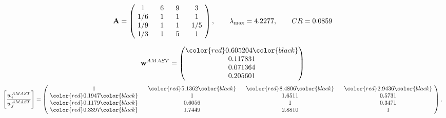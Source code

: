 \begin{example}
\begin{equation*}
\mathbf{A} =
\begin{pmatrix}
$\,\,$ 1 $\,\,$ & $\,\,$6$\,\,$ & $\,\,$9$\,\,$ & $\,\,$3 $\,\,$ \\
$\,\,$ 1/6$\,\,$ & $\,\,$ 1 $\,\,$ & $\,\,$1$\,\,$ & $\,\,$1 $\,\,$ \\
$\,\,$ 1/9$\,\,$ & $\,\,$ 1 $\,\,$ & $\,\,$ 1 $\,\,$ & $\,\,$ 1/5 $\,\,$ \\
$\,\,$ 1/3$\,\,$ & $\,\,$ 1 $\,\,$ & $\,\,$5$\,\,$ & $\,\,$ 1  $\,\,$ \\
\end{pmatrix},
\qquad
\lambda_{\max} =
4.2277,
\qquad
CR = 0.0859
\end{equation*}

\begin{equation*}
\mathbf{w}^{AMAST} =
\begin{pmatrix}
\color{red} 0.605204\color{black} \\
0.117831\\
0.071364\\
0.205601
\end{pmatrix}\end{equation*}
\begin{equation*}
\left[ \frac{{w}^{AMAST}_i}{{w}^{AMAST}_j} \right] =
\begin{pmatrix}
$\,\,$ 1 $\,\,$ & $\,\,$\color{red} 5.1362\color{black} $\,\,$ & $\,\,$\color{red} 8.4806\color{black} $\,\,$ & $\,\,$\color{red} 2.9436\color{black} $\,\,$ \\
$\,\,$\color{red} 0.1947\color{black} $\,\,$ & $\,\,$ 1 $\,\,$ & $\,\,$1.6511$\,\,$ & $\,\,$0.5731  $\,\,$ \\
$\,\,$\color{red} 0.1179\color{black} $\,\,$ & $\,\,$0.6056$\,\,$ & $\,\,$ 1 $\,\,$ & $\,\,$0.3471 $\,\,$ \\
$\,\,$\color{red} 0.3397\color{black} $\,\,$ & $\,\,$1.7449$\,\,$ & $\,\,$2.8810$\,\,$ & $\,\,$ 1  $\,\,$ \\
\end{pmatrix},
\end{equation*}


\end{example}
